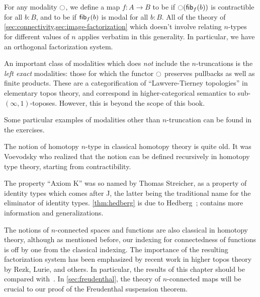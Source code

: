 For any modality $\ocircle$, we define a map $f:A\to B$ to be 
%
%
if $\ocircle({\mathsf{fib}}_{f}(b))$ is contractible for all $b:B$, and to be 
%
%
if ${\mathsf{fib}}_{f}(b)$ is modal for all $b:B$.
All of the theory of \cref{sec:connectivity,sec:image-factorization} which doesn't involve relating $n$-types for different values of $n$ applies verbatim in this generality.
%
%
In particular, we have an orthogonal factorization system.

An important class of modalities which does \emph{not} include the $n$-trun\-ca\-tions is the \emph{left exact} modalities: those for which the functor $\ocircle$ preserves pullbacks as well as finite products.
%
These are a categorification of ``Lawvere-Tierney topologies'' in elementary topos theory,
and correspond in higher-categorical semantics to sub-$(\infty,1)$-toposes.
%
However, this is beyond the scope of this book.

Some particular examples of modalities other than $n$-truncation can be found in the exercises.


\sectionNotes

The notion of homotopy $n$-type in classical homotopy theory is quite old.
It was Voevodsky who realized that the notion can be defined recursively in homotopy type theory, starting from contractibility.

%
The property ``Axiom K'' was so named by Thomas Streicher, as a property of identity types which comes after J, the latter being the traditional name for the eliminator of identity types.
\cref{thm:hedberg} is due to Hedberg~\cite{hedberg1998coherence}; \cite{krausgeneralizations} contains more information and generalizations.

The notions of $n$-connected spaces and functions are also classical in homotopy theory, although as mentioned before, our indexing for connectedness of functions is off by one from the classical indexing.
The importance of the resulting factorization system has been emphasized by recent work in higher topos theory by Rezk, Lurie, and others.%
In particular, the results of this chapter should be compared with~\cite[\S6.5.1]{lurie:higher-topoi}.
In \cref{sec:freudenthal}, the theory of $n$-connected maps will be crucial to our proof of the Freudenthal suspension theorem.

